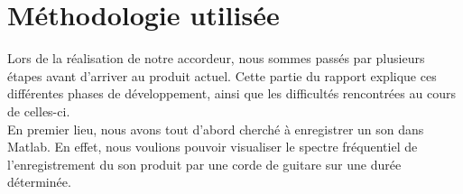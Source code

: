 \section{Méthodologie utilisée}
Lors de la réalisation de notre accordeur, nous sommes passés par plusieurs étapes avant d'arriver au produit actuel. Cette partie du rapport explique ces différentes phases de développement, ainsi que les difficultés rencontrées au cours de celles-ci.\\

En premier lieu, nous avons tout d'abord cherché à enregistrer un son dans Matlab. En effet, nous voulions pouvoir visualiser le spectre fréquentiel de l'enregistrement du son produit par une corde de guitare sur une durée déterminée.
